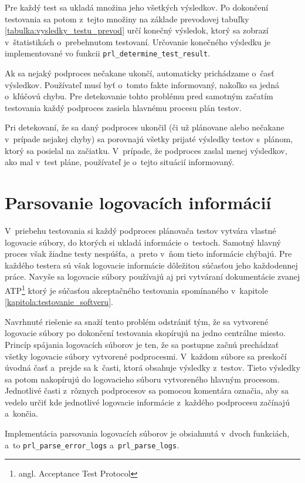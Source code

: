 Pre každý test sa ukladá množina jeho všetkých výsledkov. 
Po dokončení testovania sa potom z~tejto množiny na základe prevodovej
tabuľky \ref{tabulka:vysledky_testu_prevod} určí konečný výsledok,
ktorý sa zobrazí v~štatistikách o~prebehnutom testovaní.
Určovanie konečného výsledku je implementované vo funkcii 
\texttt{prl\_determine\_test\_result}.

Ak sa nejaký podproces nečakane ukončí, automaticky prichádzame 
o~časť výsledkov. Používateľ musí byť o~tomto fakte informovaný, 
nakoľko sa jedná o~kľúčovú chybu. Pre detekovanie tohto problému pred 
samotným začatím testovania každý podproces zasiela hlavnému procesu 
plán testov.

Pri detekovaní, že sa daný podproces ukončil (či už plánovane alebo 
nečakane v~prípade nejakej chyby) sa porovnajú všetky prijaté výsledky 
testov s~plánom, ktorý sa posielal na začiatku. V~prípade, že podproces 
zaslal menej výsledkov, ako mal v~test pláne, používateľ je o~tejto 
situácií informovaný. 

\section{Parsovanie logovacích informácií}
\label{sekcia:parsovanie_logov}
V~priebehu testovania si každý podproces plánovača testov vytvára vlastné
logovacie súbory, do ktorých si ukladá informácie o~testoch.
Samotný hlavný proces však žiadne testy nespúšťa, a~preto v~ňom tieto 
informácie chýbajú. Pre každého testera sú však logovacie informácie 
dôležitou súčasťou jeho každodennej práce. Navyše sa logovacie súbory 
používajú aj pri vytváraní dokumentácie zvanej 
ATP\footnote{angl. Acceptance Test Protocol} ktorý je súčasťou
akceptačného testovania spomínaného v~kapitole 
\ref{kapitola:testovanie_softveru}.

Navrhnuté riešenie sa snaží tento problém odstrániť tým, že sa vytvorené
logovacie súbory po dokončení testovania skopírujú na jedno centrálne miesto.
Princíp spájania logovacích súborov je ten, že sa postupne začnú prechádzať
všetky logovacie súbory vytvorené podprocesmi. 
V~každom súbore sa preskočí úvodná časť  a~prejde sa k~časti, 
ktorá obsahuje výsledky z~testov. Tieto výsledky sa potom nakopírujú
do logovacieho súboru vytvoreného hlavným procesom. 
Jednotlivé časti z~rôznych podprocesov sa pomocou komentára označia, 
aby sa vedelo určiť kde jednotlivé logovacie informácie z~každého 
podprocesu začínajú a~končia.

Implementácia parsovania logovacích súborov je obsiahnutá v~dvoch funkciách, 
a~to \texttt{prl\_parse\_error\_logs} a~\texttt{prl\_parse\_logs}. 
 


